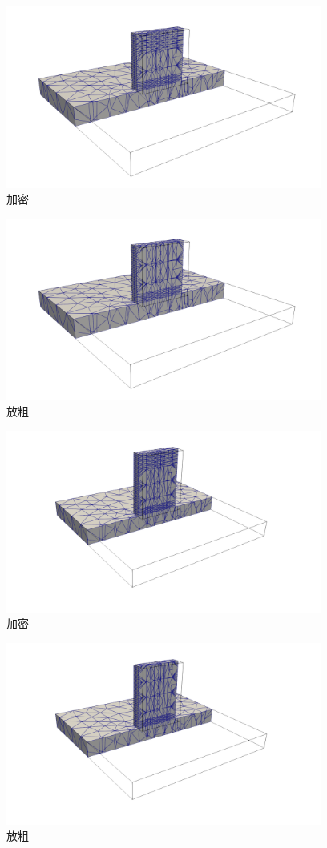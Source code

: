 \begin{figure}[!htbp]
  \centering
  \includegraphics[height=6cm]{fig/2/26.png}
  \caption{加密}
  \label{fig:2-1}
\end{figure}

\begin{figure}[!htbp]
  \centering
  \includegraphics[height=6cm]{fig/2/27.png}
  \caption{放粗}
  \label{fig:2-1}
\end{figure}

\begin{figure}[!htbp]
  \centering
  \includegraphics[height=6cm]{fig/2/28.png}
  \caption{加密}
  \label{fig:2-1}
\end{figure}

\begin{figure}[!htbp]
  \centering
  \includegraphics[height=6cm]{fig/2/29.png}
  \caption{放粗}
  \label{fig:2-1}
\end{figure}
